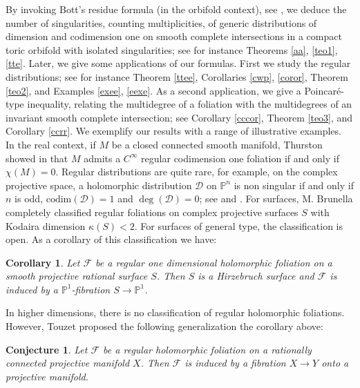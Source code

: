 \documentclass[11pt]{amsart}
\theoremstyle{plain}
\newtheorem{conj}{Conjecture}[section]
\newtheorem{cor}{Corollary}[section]
\theoremstyle{definition}
\begin{document}
By invoking Bott's residue formula (in the orbifold context), see \cite{BB,Mig,Ding,Sata,Iza,Jou,Mig2}, we deduce the number of singularities, counting multiplicities, of generic distributions of dimension and codimension one on smooth complete intersections in a compact toric orbifold with isolated singularities; see for instance Theorems \ref{aa}, \ref{teo1}, \ref{tte}.
Later, we give some applications of our formulas. First we study the regular distributions; see for instance Theorem \ref{ttee},
Corollaries \ref{cwp}, \ref{coror}, Theorem \ref{teo2}, and Examples \ref{exee}, \ref{eexe}. As a second application, we give a 
Poincar\'e-type inequality, relating the multidegree of a foliation with the multidegrees of an invariant smooth complete intersection;
see Corollary \ref{cccor}, Theorem \ref{teo3}, and Corollary \ref{ccrr}.
We exemplify our results with a range of illustrative examples. \\

In the real context, if $M$ be a closed connected smooth manifold, Thurston showed in \cite{Tu} that 
$M$ admits a $C^{\infty}$ regular codimension one foliation if and only if $\chi(M)=0$.
Regular distributions are quite rare, for example, on the complex projective space, a holomorphic distribution $\mathcal{D}$ 
on $\mathbb{P}^{n}$ is non singular if and only if $n$ is odd, $\mathrm{codim}(\mathcal{D})=1$ and $\deg(\mathcal{D})=0$; see
\cite[p.36]{Coo} and \cite{GHS}. For surfaces, M. Brunella completely classified regular foliations on complex projective surfaces $S$ with Kodaira dimension $\kappa(S)<2$. For surfaces of general type, the classification is open. As a corollary of this classification we have:

\begin{cor} \cite{Bru}
Let $\mathcal{F}$ be a regular one dimensional holomorphic foliation on a smooth projective rational surface $S$. 
Then $S$ is a Hirzebruch surface and $\mathcal{F}$ is induced by a $\mathbb{P}^{1}$-fibration $S\rightarrow\mathbb{P}^{1}$.
\end{cor}

In higher dimensions, there is no classification of regular holomorphic foliations. 
However, Touzet proposed the following generalization the corollary above:

\begin{conj} \cite{Dru}
Let $\mathcal{F}$  be a regular holomorphic foliation on a rationally connected projective manifold $X$. 
Then $\mathcal{F}$ is induced by a fibration $X\rightarrow Y$ onto a projective manifold.
\end{conj}
\end{document}
